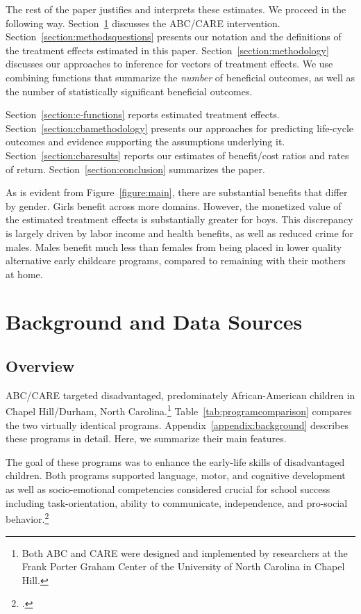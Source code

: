 The rest of the paper justifies and interprets these estimates. We proceed in the following way. Section~\ref{section:background} discusses the ABC/CARE intervention. Section~\ref{section:methodsquestions} presents our notation and the definitions of the treatment effects estimated in this paper. Section~\ref{section:methodology} discusses our approaches to inference for vectors of treatment effects. We use combining functions that summarize the \emph{number} of beneficial outcomes, as well as the number of statistically significant beneficial outcomes.

Section~\ref{section:c-functions} reports estimated treatment effects. Section~\ref{section:cbamethodology} presents our approaches for predicting life-cycle outcomes and evidence supporting the assumptions underlying it. Section~\ref{section:cbaresults} reports our estimates of benefit/cost ratios and rates of return. Section~\ref{section:conclusion} summarizes the paper.

As is evident from Figure~\ref{figure:main}, there are substantial benefits that differ by gender. Girls benefit across more domains. However, the monetized value of the estimated treatment effects is substantially greater for boys. This discrepancy is largely driven by labor income and health benefits, as well as reduced crime for males. Males benefit much less than females from being placed in lower quality alternative early childcare programs, compared to remaining with their mothers at home.

\section[Background and Data Sources]{Background and Data Sources} \label{section:background}

\subsection{Overview}

ABC/CARE targeted disadvantaged, predominately African-American children in Chapel Hill/Durham, North Carolina.\footnote{Both ABC and CARE were designed and implemented by researchers at the Frank Porter Graham Center of the University of North Carolina in Chapel Hill.} Table~\ref{tab:programcomparison} compares the two virtually identical programs. Appendix~\ref{appendix:background} describes these programs in detail. Here, we summarize their main features.

The goal of these programs was to enhance the early-life skills of disadvantaged children. Both programs supported language, motor, and cognitive development as well as socio-emotional competencies considered crucial for school success including task-orientation, ability to communicate, independence, and pro-social behavior.\footnote{\citet{Ramey_Collier_etal_1976_CarolinaAbecedarianProject, Ramey_etal_1985_Project-CARE_TiECSE, Sparling_1974_Synth_Edu_Infant_SPEECH, Wasik_Ramey_etal_1990_CD, Ramey-etal_2012-ABC}.}

